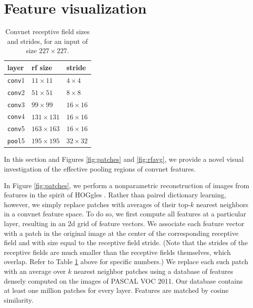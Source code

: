 \documentclass{article} %
\begin{document}
\section{Feature visualization}

\begin{table}
    \centering
    \small
    \caption{Convnet receptive field sizes and strides, for an input of size
    $227 \times 227$. }
    \begin{tabular}{lll}
        layer & rf size & stride \\
        \hline
        \texttt{conv}1 & $11 \times 11$ & $4 \times 4$ \\
        \texttt{conv}2 & $51 \times 51$ & $8 \times 8$ \\
        \texttt{conv}3 & $99 \times 99$ & $16 \times 16$ \\
        \texttt{conv}4 & $131 \times 131$ & $16 \times 16$ \\
        \texttt{conv}5 & $163 \times 163$ & $16 \times 16$ \\
        \texttt{pool}5 & $195 \times 195$ & $32 \times 32$
    \end{tabular}
    \label{tab:rfs}
\end{table}

In this section and Figures \ref{fig:patches} and \ref{fig:rfavg}, we provide a
novel visual investigation of the effective pooling regions of convnet features.

In Figure \ref{fig:patches}, we perform a nonparametric reconstruction of images
from features in the spirit of HOGgles \cite{hoggles}.
Rather than paired dictionary learning, however, we simply replace patches with
averages of their top-$k$ nearest neighbors in a convnet feature space.
To do so, we first compute all features at a particular layer, resulting in an
2d grid of feature vectors.
We associate each feature vector with a patch in the original image at the
center of the corresponding receptive field and with size equal to the receptive
field stride.
(Note that the strides of the receptive fields are much smaller than the
receptive fields themselves, which overlap.
Refer to Table \ref{tab:rfs} above for specific numbers.)
We replace each such patch with an average over $k$ nearest neighbor patches
using a database of features densely computed on the images of PASCAL VOC 2011.
Our database contains at least one million patches for every layer.
Features are matched by cosine similarity.
\end{document}
